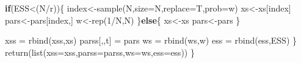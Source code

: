 \documentclass[
]{article}
\newenvironment{Shaded}{\begin{snugshade}}{\end{snugshade}}
\newcommand{\AttributeTok}[1]{\textcolor[rgb]{0.77,0.63,0.00}{#1}}
\newcommand{\ControlFlowTok}[1]{\textcolor[rgb]{0.13,0.29,0.53}{\textbf{#1}}}
\newcommand{\DecValTok}[1]{\textcolor[rgb]{0.00,0.00,0.81}{#1}}
\newcommand{\FunctionTok}[1]{\textcolor[rgb]{0.00,0.00,0.00}{#1}}
\newcommand{\NormalTok}[1]{#1}
\newcommand{\OtherTok}[1]{\textcolor[rgb]{0.56,0.35,0.01}{#1}}
\newcommand{\SpecialCharTok}[1]{\textcolor[rgb]{0.00,0.00,0.00}{#1}}
\begin{document}
\begin{Shaded}
\begin{Highlighting}[]
    \ControlFlowTok{if}\NormalTok{(ESS}\SpecialCharTok{\textless{}}\NormalTok{(N}\SpecialCharTok{/}\NormalTok{r))\{}
\NormalTok{      index}\OtherTok{\textless{}{-}}\FunctionTok{sample}\NormalTok{(N,}\AttributeTok{size=}\NormalTok{N,}\AttributeTok{replace=}\NormalTok{T,}\AttributeTok{prob=}\NormalTok{w)}
\NormalTok{      xs}\OtherTok{\textless{}{-}}\NormalTok{xs[index]}
\NormalTok{      pars}\OtherTok{\textless{}{-}}\NormalTok{pars[index,]}
\NormalTok{      w}\OtherTok{\textless{}{-}}\FunctionTok{rep}\NormalTok{(}\DecValTok{1}\SpecialCharTok{/}\NormalTok{N,N)}
\NormalTok{    \}}\ControlFlowTok{else}\NormalTok{\{}
\NormalTok{      xs}\OtherTok{\textless{}{-}}\NormalTok{xs}
\NormalTok{      pars}\OtherTok{\textless{}{-}}\NormalTok{pars}
\NormalTok{    \}}
    
    
\NormalTok{    xss         }\OtherTok{=} \FunctionTok{rbind}\NormalTok{(xss,xs)}
\NormalTok{    parss[,,t]  }\OtherTok{=}\NormalTok{ pars }
\NormalTok{    ws          }\OtherTok{=} \FunctionTok{rbind}\NormalTok{(ws,w)}
\NormalTok{    ess         }\OtherTok{=} \FunctionTok{rbind}\NormalTok{(ess,ESS)}
\NormalTok{  \}}
  \FunctionTok{return}\NormalTok{(}\FunctionTok{list}\NormalTok{(}\AttributeTok{xss=}\NormalTok{xss,}\AttributeTok{parss=}\NormalTok{parss,}\AttributeTok{ws=}\NormalTok{ws,}\AttributeTok{ess=}\NormalTok{ess))}
\NormalTok{\}}
\end{Highlighting}
\end{Shaded}
\end{document}
